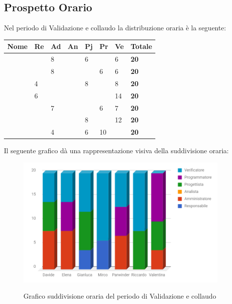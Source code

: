 \documentclass[PianoDiProgetto.tex]{subfiles}
\begin{document}
\subsection{Prospetto Orario}
Nel periodo di Validazione e collaudo la distribuzione oraria è la seguente:
\begin{center}
	\begin{table}[htbp]
		\centering
		\renewcommand\arraystretch{1.5}
		\begin{tabularx}{\textwidth}{p{4cm}|p{1cm}|p{1cm}|p{1cm}|p{1cm}|p{1cm}|p{1cm}|p{2cm}}
			\hline
			\textbf{Nome} & \textbf{Re} & \textbf{Ad} & \textbf{An} & \textbf{Pj} & \textbf{Pr} & \textbf{Ve} & \textbf{Totale} \\
			\hline
			\Davide & \ & 8 & \ & 6 & \ & 6 & \textbf{20} \\
			\hline
			\Elena & \ & 8 & \ & \ & 6 & 6 & \textbf{20} \\
			\hline
			\Gianluca & 4 & \ & \ & 8 & \ & 8 & \textbf{20} \\
			\hline
			\Mirco & 6 & \ & \ & \ & \ & 14 & \textbf{20} \\
			\hline
			\Parwinder & \ & 7 & \ & \ & 6 & 7 & \textbf{20} \\
			\hline
			\Riccardo & \ & \ & \ & 8 & \ & 12 & \textbf{20} \\
			\hline
			\Valentina & \ & 4 & \ & 6 & 10 & \ & \textbf{20} \\
			\hline
		\end{tabularx}
	\end{table} 	
\end{center}
Il seguente grafico dà una rappresentazione visiva della suddivisione oraria:
\begin{figure}[h]
	\centering
	\includegraphics[width=10.5cm]{images/prospettoOrario/valCol.png}
	\label{fig:foo}
	\caption{Grafico suddivisione oraria del periodo di Validazione e collaudo}
\end{figure} 
\newpage
\end{document}
